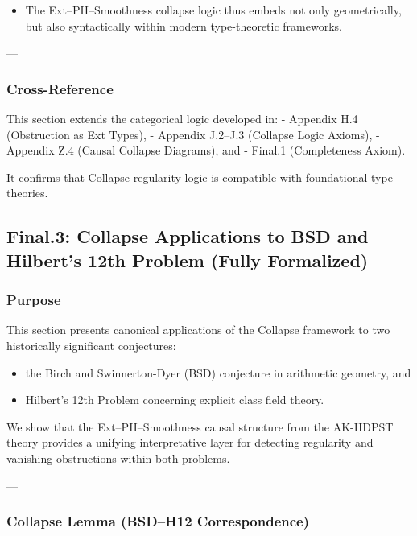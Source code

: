 \documentclass[11pt]{article}
\begin{document}
\begin{axiom}
\begin{axiom}
{{\begin{itemize}
  \item The Ext–PH–Smoothness collapse logic thus embeds not only geometrically,  
  but also syntactically within modern type-theoretic frameworks.
\end{itemize}

---

\subsubsection*{Cross-Reference}

This section extends the categorical logic developed in:
- Appendix H.4 (Obstruction as Ext Types),
- Appendix J.2–J.3 (Collapse Logic Axioms),
- Appendix Z.4 (Causal Collapse Diagrams), and
- Final.1 (Completeness Axiom).

It confirms that Collapse regularity logic is compatible with foundational type theories.




\subsection*{Final.3: Collapse Applications to BSD and Hilbert’s 12th Problem (Fully Formalized)}

\subsubsection*{Purpose}

This section presents canonical applications of the Collapse framework  
to two historically significant conjectures:

\begin{itemize}
  \item the Birch and Swinnerton-Dyer (BSD) conjecture in arithmetic geometry, and
  \item Hilbert’s 12th Problem concerning explicit class field theory.
\end{itemize}

We show that the Ext–PH–Smoothness causal structure from the AK-HDPST theory  
provides a unifying interpretative layer for detecting regularity and vanishing obstructions  
within both problems.

---

\subsubsection*{Collapse Lemma (BSD–H12 Correspondence)}

}}
\end{axiom}
\end{axiom}
\end{document}
